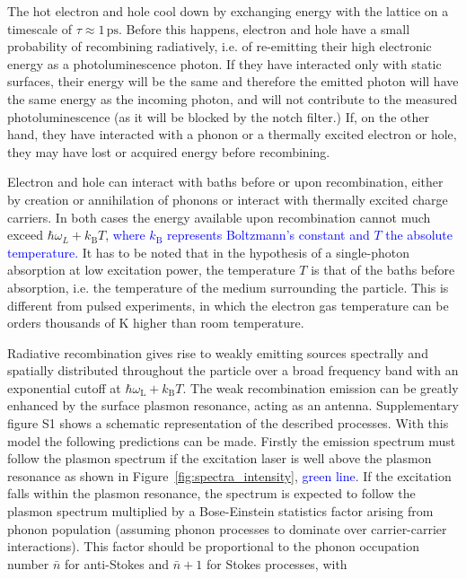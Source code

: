\documentclass[journal=nalefd,manuscript=letter]{achemso}
\newcommand{\HI}[1]{\textcolor{blue}{#1}} %
\newcommand{\ps}{\ensuremath{\,\textrm{ps}}}
\begin{document}
The hot electron and hole cool down by exchanging energy with the lattice on a
timescale of $\tau\approx1\ps$\cite{Pustovalov2005}. Before this happens,
electron and hole have a small probability of recombining radiatively, i.e. of 
re-emitting their high electronic energy as a photoluminescence photon. If they
have interacted only with static surfaces, their energy will be the same and
therefore the emitted photon will have the same energy as the incoming
photon, and will not contribute to the measured photoluminescence (as it will be
blocked by the notch filter.) If, on the other hand, they have interacted with a
phonon or a thermally excited electron or hole, they may have lost or acquired
energy before recombining.

Electron and hole can interact with baths before or upon recombination, either by
creation or annihilation of phonons or interact with thermally excited charge
carriers. In both cases the energy available upon
recombination cannot much exceed $\hbar\omega_L+k_\textrm{B}T$, \HI{where $k_\textrm{B}$ 
represents Boltzmann's constant and $T$ the absolute temperature.} 
It has to be noted that in the hypothesis of a single-photon absorption at low 
excitation power, the temperature $T$ is that of the baths before absorption, i.e. the temperature of
the medium surrounding the particle. This is different from pulsed experiments,
in which the electron gas temperature can be orders thousands of K higher than
room temperature\cite{Baffou2013a}. 

Radiative recombination gives rise to weakly emitting sources spectrally and
spatially distributed throughout the particle over a broad frequency band with
an exponential cutoff at $\hbar\omega_\textrm{L}+k_\textrm{B}T$. The weak
recombination emission can be greatly enhanced by the surface plasmon resonance,
acting as an antenna. Supplementary figure S1 shows a schematic representation
of the described processes. With this model the following predictions can be made.
Firstly the emission spectrum must follow the plasmon spectrum if the excitation
laser is well above the plasmon resonance as shown in \mbox{Figure
\ref{fig:spectra_intensity}}, \HI{green line}. If the excitation falls within the
plasmon resonance, the spectrum is expected to follow the plasmon spectrum
multiplied by a Bose-Einstein statistics factor arising from phonon population
(assuming phonon processes to dominate over carrier-carrier interactions).
This factor should be proportional to the phonon occupation number
$\bar{n}$ for anti-Stokes and $\bar{n}+1$ for Stokes processes, with
\end{document}
